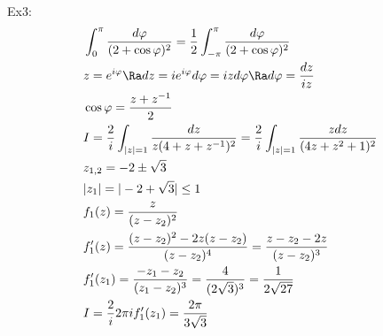 Ex3:
\begin{align*}
    &\int_0^\pi\frac{d\varphi}{(2+\cos\varphi)^2}=\frac{1}{2}\int_{-\pi}^\pi\frac{d\varphi}{(2+\cos\varphi)^2}\\
    &z=e^{i\varphi}\Ra dz=ie^{i\varphi}d\varphi=izd\varphi\Ra d\varphi=\frac{dz}{iz}\\
    &\cos\varphi=\frac{z+z^{-1}}{2}\\
    &I=\frac{2}{i}\int_{|z|=1}\frac{dz}{z(4+z+z^{-1})^2}=\frac{2}{i}\int_{|z|=1}\frac{zdz}{(4z+z^2+1)^2}\\
    &z_{1,2}=-2\pm\sqrt{3}\\
    &|z_1|=|-2+\sqrt{3}|\leq1\\
    &f_1(z)=\frac{z}{(z-z_2)^2}\\
    &f_1'(z)=\frac{(z-z_2)^2-2z(z-z_2)}{(z-z_2)^4}=\frac{z-z_2-2z}{(z-z_2)^3}\\
    &f_1'(z_1)=\frac{-z_1-z_2}{(z_1-z_2)^3}=\frac{4}{(2\sqrt{3})^3}=\frac{1}{2\sqrt{27}}\\
    &I=\frac{2}{i}2\pi if_1'(z_1)=\frac{2\pi}{3\sqrt{3}}
\end{align*}

